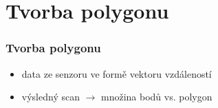 \documentclass[notes=false,pdftex]{beamer}
\begin{document}
\section{Tvorba polygonu}
{
\begin{frame}%
	\frametitle{Tvorba polygonu}

	\begin{itemize}
		\item data ze senzoru ve formě vektoru vzdáleností
		\item výsledný scan $\longrightarrow$ množina bodů vs. polygon
	\end{itemize}

\end{frame}
}

\end{document}
